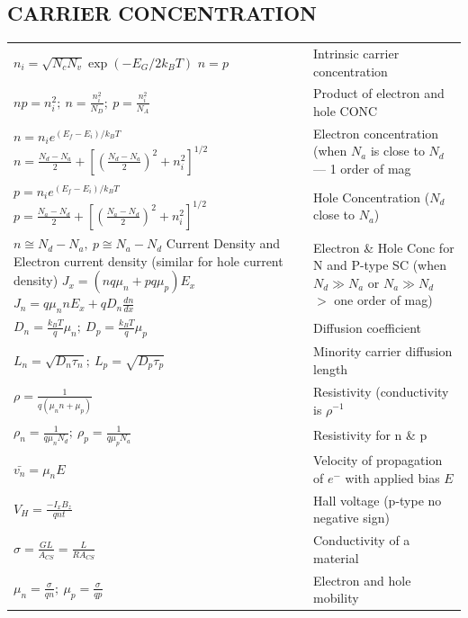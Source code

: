 \begin{multicols}{3}
\subsection{CARRIER CONCENTRATION}
\begin{tabular}{p{5.25cm}p{3cm}}
$n_i= \sqrt{N_c N_v}\exp(-E_G/2k_BT)$ $n=p$ & Intrinsic carrier concentration \\
$np=n_i^2; \ n=\frac{n_i^2}{N_D}; \ p=\frac{n_i^2}{N_A}$ & Product of electron and hole CONC \\
$n=n_ie^{(E_f-E_i)/k_BT}$ \hfill \newline $n=\frac{N_d-N_a}{2}+\left[ \left(\frac{N_d-N_a}{2} \right)^2+n_i^2\right]^{1/2}$ & Electron concentration (when $N_a$ is close to $N_d$ --- 1 order of mag \\
$p=n_ie^{(E_f-E_i)/k_BT}$ \hfill \newline $p=\frac{N_a-N_d}{2}+\left[ \left(\frac{N_a-N_d}{2} \right)^2+n_i^2\right]^{1/2}$ & Hole Concentration ($N_d$ close to $N_a$) \\
$n \cong N_d-N_a, \ p \cong N_a - N_d $ \hfill \newline
Current Density and Electron current density (similar for hole current density) \hfill \newline
$J_x=(nq\mu_n+pq\mu_p)E_x$ \hfill \newline
$J_n=q \mu_n nE_x+qD_n\frac{dn}{dx}$ \hfill \newline 
& Electron \& Hole Conc for N and P-type SC (when $N_d \gg N_a$ or $N_a \gg N_d$ $>$ one order of mag) \\
$D_n=\frac{k_BT}{q}\mu_n; \ D_p=\frac{k_BT}{q}\mu_p$ & Diffusion coefficient \\
$L_n=\sqrt{D_n \tau_n}; \ L_p=\sqrt{D_p \tau_p}$ & Minority carrier diffusion length \\
$\rho = \frac{1}{q(\mu_n n + \mu_p)}$ & Resistivity (conductivity is $\rho^{-1}$ \\
$\rho_n=\frac{1}{q \mu_n N_d}; \ \rho_p=\frac{1}{q \mu_p N_a}$ & Resistivity for n \& p \\
$\bar{v_n}= \mu_n E$ & Velocity of propagation of $e^-$ with applied bias $E$ \\
$V_H=\frac{-I_xB_z}{qnt}$ & Hall voltage (p-type no negative sign) \\
$\sigma=\frac{GL}{A_{CS}}=\frac{L}{RA_{CS}}$ & Conductivity of a material \\
$\mu_n=\frac{\sigma}{qn}; \ \mu_p=\frac{\sigma}{qp}$ & Electron and hole mobility
\end{tabular}

\end{multicols}
